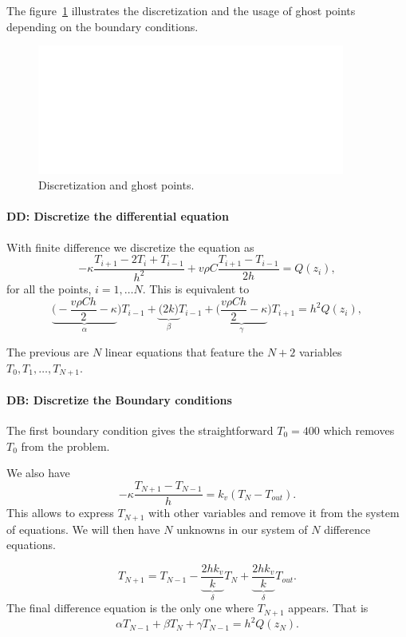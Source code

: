 \documentclass[11pt,a4paper]{report}
\begin{document}
The figure~\ref{fig:0} illustrates the discretization and the usage of ghost points depending on the boundary conditions. 

\begin{figure}[!h]
\centering
\includegraphics[width = 0.9\textwidth]{./white.png}
\caption{Discretization and ghost points.}
\label{fig:0}
\end{figure}

\FloatBarrier

\paragraph*{DD: Discretize the differential equation}


With finite difference we discretize the equation as 
$$-\kappa \dfrac{T_{i+1}-2T_{i}+T_{i-1}}{h^{2}}
+ v\rho C\dfrac{T_{i+1}-T_{i-1}}{2h}=Q(z_{i}),$$
for all the points, $i=1, \dots N$. This is equivalent to
$$\underbrace{\Big(-\dfrac{v\rho Ch}{2}  -\kappa    }_{\alpha}\Big) T_{i-1} 
+ \underbrace{\Big(2k\Big)}_{\beta} T_{i-1}
+ \underbrace{\Big( \dfrac{v\rho Ch}{2}  -\kappa    }_{\gamma}\Big) T_{i+1}
=h^{2}Q(z_{i}),$$

The previous are $N$ linear equations that feature the $N+2$ variables $T_{0}, T_{1}, \dots, T_{N+1}$.

\paragraph*{DB: Discretize the Boundary conditions}

The first boundary condition gives 
the straightforward $T_{0}=400$ which removes $T_{0}$ from the problem.

We also have 
$$-\kappa \dfrac{T_{N+1}-T_{N-1}}{h}=k_{v}(T_{N}-T_{out}).$$
This allows to express $T_{N+1}$ with other variables and remove it from the system of equations. We will then have $N$ unknowns in our system of $N$ difference equations.

\begin{equation}
T_{N+1}=T_{N-1}-\underbrace{\dfrac{2hk_{v}}{k}}_{\delta} T_{N}+\underbrace{\dfrac{2hk_{v}}{k}}_{\delta}T_{out}.
\label{TN1}
\end{equation}
The final difference equation is the only one where $T_{N+1}$ appears. That is
$$\alpha T_{N-1} + \beta T_{N} + \gamma T_{N-1} =h^{2} Q(z_{N}).$$
\end{document}
